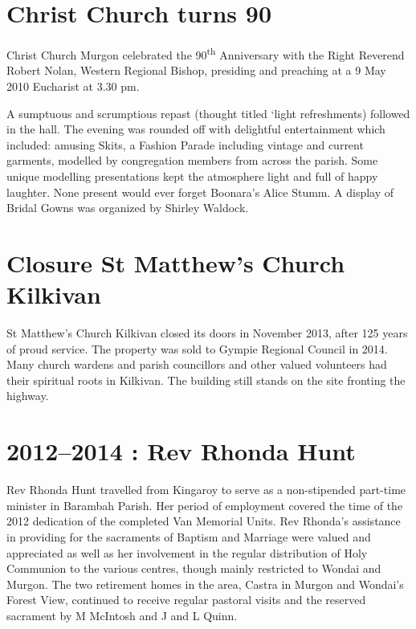 \hypertarget{christ-church-turns-90}{%
\section{Christ Church turns 90}\label{christ-church-turns-90}}

Christ Church Murgon celebrated the 90\textsuperscript{th} Anniversary with the Right Reverend Robert Nolan, Western Regional Bishop, presiding and preaching at a 9 May 2010 Eucharist at 3.30 pm.

A sumptuous and scrumptious repast (thought titled `light refreshments) followed in the hall. The evening was rounded off with delightful entertainment which included: amusing Skits, a Fashion Parade including vintage and current garments, modelled by congregation members from across the parish. Some unique modelling presentations kept the atmosphere light and full of happy laughter. None present would ever forget Boonara's Alice Stumm. A display of Bridal Gowns was organized by Shirley Waldock.

\hypertarget{closure-st-matthews-church-kilkivan}{%
\section{Closure St Matthew's Church Kilkivan}\label{closure-st-matthews-church-kilkivan}}

St Matthew's Church Kilkivan closed its doors in November 2013, after 125 years of proud service. The property was sold to Gympie Regional Council in 2014. Many church wardens and parish councillors and other valued volunteers had their spiritual roots in Kilkivan. The building still stands on the site fronting the highway.

\hypertarget{rev-rhonda-hunt}{%
\section{2012--2014 : Rev Rhonda Hunt}\label{rev-rhonda-hunt}}

Rev Rhonda Hunt travelled from Kingaroy to serve as a non-stipended part-time minister in Barambah Parish. Her period of employment covered the time of the 2012 dedication of the completed Van Memorial Units. Rev Rhonda's assistance in providing for the sacraments of Baptism and Marriage were valued and appreciated as well as her involvement in the regular distribution of Holy Communion to the various centres, though mainly restricted to Wondai and Murgon. The two retirement homes in the area, Castra in Murgon and Wondai's Forest View, continued to receive regular pastoral visits and the reserved sacrament by M McIntosh and J and L Quinn.

